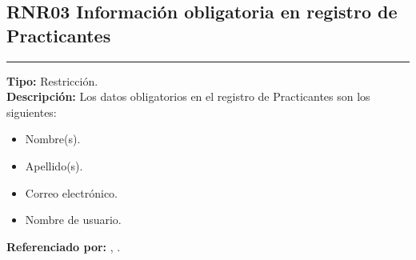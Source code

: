 \subsection{\normalsize{\textcolor[rgb]{0, 0, 0.545098}{RNR03 Información obligatoria en registro de Practicantes}}}
\label{rn:RNR03}
\rule[3mm]{16.59cm}{0.1mm} \vspace{1mm}
\textbf{Tipo:} Restricción.\\
\textbf{Descripción:} Los datos obligatorios en el registro de Practicantes son los siguientes:
\begin{itemize} \itemsep1pt \parskip0pt 
	\item Nombre(s).
	\item Apellido(s).
	\item Correo electrónico.
	\item Nombre de usuario.
\end{itemize}
\textbf{Referenciado por: } ,  .\\

